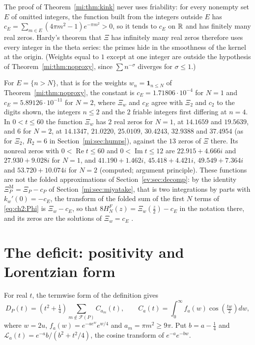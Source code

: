 The proof of Theorem~\ref{mi:thm:kink} never uses friability: for every nonempty set $E$ of omitted integers, the function built from the integers outside $E$ has $c_E=\sum_{m\in E}(4\pi m^2-1)e^{-\pi m^2}>0$, so it tends to $c_E$ on $\mathbb{R}$ and has finitely many real zeros. Hardy's theorem \cite{Hardy14} that $\Xi$ has infinitely many real zeros therefore uses every integer in the theta series: the primes hide in the smoothness of the kernel at the origin. (Weights equal to $1$ except at one integer are outside the hypothesis of Theorem~\ref{mi:thm:noproxy}, since $\sum n^{-\sigma}$ diverges for $\sigma\le1$.)

\begin{resultpar}\label{mi:res:trunc}For $E=\{n>N\}$, that is for the weights $w_n=\mathbf 1_{n\le N}$ of Theorem~\ref{mi:thm:noproxy}, the constant is $c_E=1.71806\cdot10^{-4}$ for $N=1$ and $c_E=5.89126\cdot10^{-11}$ for $N=2$, where $\Xi_w$ and $c_E$ agree with $\Xi_2$ and $c_2$ to the digits shown, the integers $n\le2$ and the $2$ friable integers first differing at $n=4$. In $0<t\le60$ the function $\Xi_w$ has $2$ real zeros for $N=1$, at $14.1659$ and $19.5639$, and $6$ for $N=2$, at $14.1347$, $21.0220$, $25.0109$, $30.4243$, $32.9388$ and $37.4954$ (as for $\Xi_2$, $R_2=6$ in Section~\ref{mi:sec:humps}), against the $13$ zeros of $\Xi$ there. Its nonreal zeros with $0<\operatorname{Re}t\le60$ and $0<\operatorname{Im}t\le12$ are $22.915+4.666i$ and $27.930+9.028i$ for $N=1$, and $41.190+1.462i$, $45.418+4.421i$, $49.549+7.364i$ and $53.720+10.074i$ for $N=2$ (computed; argument principle). These functions are not the folded approximations of Section~\ref{ev:sec:decomp}: by the identity $\Xi_P^{\mathrm M}=\Xi_P-c_P$ of Section~\ref{mi:sec:miyatake}, that is two integrations by parts with $k_w'(0)=-c_E$, the transform of the folded sum of the first $N$ terms of \eqref{eq:ch2:Phi} is $\Xi_w-c_E$, so that $8H^F_N(z)=\Xi_w(\tfrac z2)-c_E$ in the notation there, and its zeros are the solutions of $\Xi_w=c_E$ \cite{P26fchap}.\end{resultpar}

\section{The deficit: positivity and Lorentzian form}\label{mi:sec:deficit}

For real $t$, the termwise form of the definition gives
\begin{equation}\label{mi:eq:D}
D_P(t)=\left(t^2+\tfrac14\right)\sum_{m\notin\mathcal F(P)}C_{a_m}(t),\qquad C_a(t)=\int_0^\infty f_a(w)\cos\!\left(\tfrac{tw}2\right)dw,
\end{equation}
where $w=2u$, $f_a(w)=e^{-ae^w}e^{w/4}$ and $a_m=\pi m^2\ge9\pi$. Put $b=a-\tfrac14$ and $\mathcal L_a(t)=e^{-a}b/(b^2+t^2/4)$, the cosine transform of $e^{-a}e^{-bw}$.


